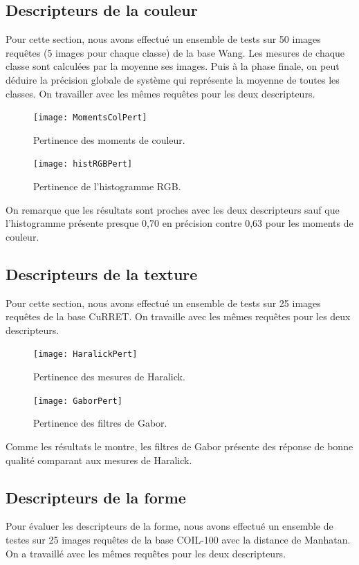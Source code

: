 \subsection{Descripteurs de la couleur}
Pour cette section, nous avons effectué un ensemble de tests sur 50 images requêtes (5 images pour chaque classe) de la base Wang. Les mesures de chaque classe sont calculées par la moyenne ses images. Puis à la phase finale, on peut déduire la précision globale de système qui représente la moyenne de toutes les classes. On travailler avec les mêmes requêtes pour les deux descripteurs.

\begin{figure}[H]
	\centering
	\texttt{[image: MomentsColPert]} 
	\caption{Pertinence des moments de couleur.}
\end{figure}

\begin{figure}[H]
	\centering
	\texttt{[image: histRGBPert]} 
	\caption{Pertinence de l'histogramme RGB.}
\end{figure}
On remarque que les résultats sont proches avec les deux descripteurs sauf que l'histogramme présente presque 0,70 en précision contre 0,63 pour les moments de couleur.
\subsection{Descripteurs de la texture}
Pour cette section, nous avons effectué un ensemble de tests sur 25 images requêtes de la base CuRRET. On travaille avec les mêmes requêtes pour les deux descripteurs.

\begin{figure}[H]
	\centering
	\texttt{[image: HaralickPert]} 
	\caption{Pertinence des mesures de Haralick.}
\end{figure}

\begin{figure}[H]
	\centering
	\texttt{[image: GaborPert]} 
	\caption{Pertinence des filtres de Gabor.}
\end{figure}
Comme les résultats le montre, les filtres de Gabor présente des réponse de bonne qualité comparant aux mesures de Haralick.
\subsection{Descripteurs de la forme}
Pour évaluer les descripteurs de la forme, nous avons effectué un ensemble de testes sur 25 images requêtes de la base COIL-100 avec la distance de Manhatan. On a travaillé avec les mêmes requêtes pour les deux descripteurs.

